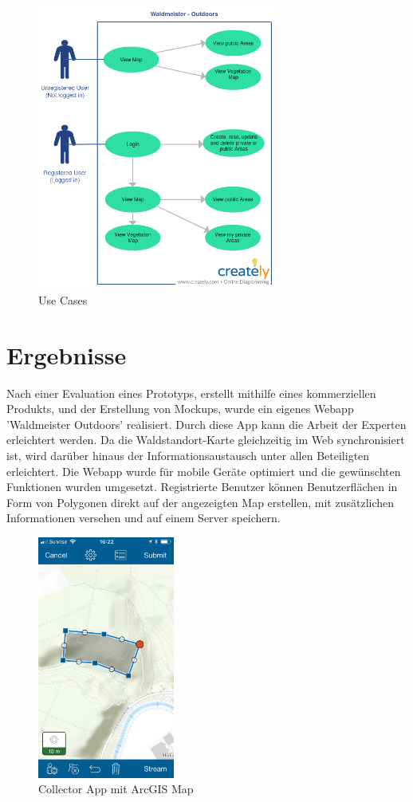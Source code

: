 \begin{figure}[H]
\centering
    \includegraphics[width=0.7\textwidth]{WaldmeisterMap_USECASE}
    \caption{Use Cases}
    \label{fig:uc1}
\end{figure}


\section{Ergebnisse}
Nach einer Evaluation eines Prototyps, erstellt mithilfe eines kommerziellen Produkts,
und der Erstellung von Mockups, wurde ein eigenes Webapp 'Waldmeister Outdoors' realisiert. Durch diese App kann die Arbeit der Experten erleichtert werden. Da die Waldstandort-Karte gleichzeitig im Web synchronisiert
ist, wird dar\"uber hinaus der Informationsaustausch unter allen Beteiligten erleichtert. Die Webapp wurde f\"ur mobile Ger\"ate optimiert und die gew\"unschten Funktionen wurden umgesetzt. Registrierte Benutzer k\"onnen Benutzerfl\"achen in Form von Polygonen direkt auf der angezeigten Map erstellen, mit zus\"atzlichen Informationen versehen und auf einem Server speichern.

\begin{figure}[H]
\centering
    \includegraphics[width=0.4\textwidth]{collectorapp}
    \caption{Collector App mit ArcGIS Map}
    \label{fig:es1}
\end{figure}

